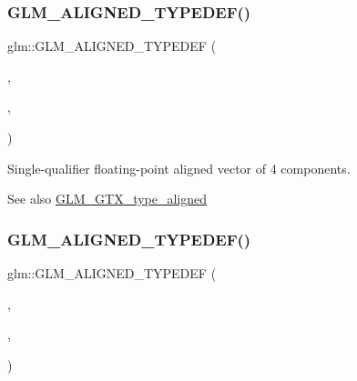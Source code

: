 \subsubsection{\texorpdfstring{G\+L\+M\+\_\+\+A\+L\+I\+G\+N\+E\+D\+\_\+\+T\+Y\+P\+E\+D\+E\+F()}{GLM\_ALIGNED\_TYPEDEF()}\hspace{0.1cm}{\footnotesize\ttfamily [150/209]}}
{\footnotesize\ttfamily glm\+::\+G\+L\+M\+\_\+\+A\+L\+I\+G\+N\+E\+D\+\_\+\+T\+Y\+P\+E\+D\+EF (\begin{DoxyParamCaption}\item[{\mbox{\hyperlink{group__gtc__type__precision_ga0319cdd208269c180e326b243e2e84e4}{fvec4}}}]{,  }\item[{aligned\+\_\+fvec4}]{,  }\item[{16}]{ }\end{DoxyParamCaption})}

Single-\/qualifier floating-\/point aligned vector of 4 components. \begin{DoxySeeAlso}{See also}
\mbox{\hyperlink{group__gtx__type__aligned}{G\+L\+M\+\_\+\+G\+T\+X\+\_\+type\+\_\+aligned}} 
\end{DoxySeeAlso}
\mbox{\label{group__gtx__type__aligned_ga309f495a1d6b75ddf195b674b65cb1e4}} 
\subsubsection{\texorpdfstring{G\+L\+M\+\_\+\+A\+L\+I\+G\+N\+E\+D\+\_\+\+T\+Y\+P\+E\+D\+E\+F()}{GLM\_ALIGNED\_TYPEDEF()}\hspace{0.1cm}{\footnotesize\ttfamily [151/209]}}
{\footnotesize\ttfamily glm\+::\+G\+L\+M\+\_\+\+A\+L\+I\+G\+N\+E\+D\+\_\+\+T\+Y\+P\+E\+D\+EF (\begin{DoxyParamCaption}\item[{\mbox{\hyperlink{group__gtc__type__precision_ga27d40e360fd5b6ad39ca34ded8210b53}{f32vec1}}}]{,  }\item[{aligned\+\_\+f32vec1}]{,  }\item[{4}]{ }\end{DoxyParamCaption})}

